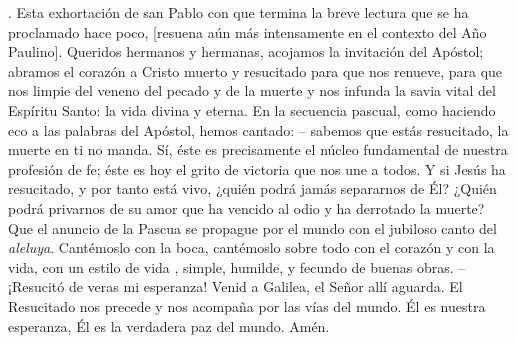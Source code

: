 \begin{body}
. Esta exhortación de san Pablo con que termina la breve lectura que se ha proclamado hace poco, [resuena aún más intensamente en el contexto del Año Paulino]. Queridos hermanos y hermanas, acojamos la invitación del Apóstol; abramos el corazón a Cristo muerto y resucitado para que nos renueve, para que nos limpie del veneno del pecado y de la muerte y nos infunda la savia vital del Espíritu Santo: la vida divina y eterna. En la secuencia pascual, como haciendo eco a las palabras del Apóstol, hemos cantado:  – sabemos que estás resucitado, la muerte en ti no manda. Sí, éste es precisamente el núcleo fundamental de nuestra profesión de fe; éste es hoy el grito de victoria que nos une a todos. Y si Jesús ha resucitado, y por tanto está vivo, ¿quién podrá jamás separarnos de Él? ¿Quién podrá privarnos de su amor que ha vencido al odio y ha derrotado la muerte? Que el anuncio de la Pascua se propague por el mundo con el jubiloso canto del \textit{aleluya}. Cantémoslo con la boca, cantémoslo sobre todo con el corazón y con la vida, con un estilo de vida , simple, humilde, y fecundo de buenas obras.  – ¡Resucitó de veras mi esperanza! Venid a Galilea, el Señor allí aguarda. El Resucitado nos precede y nos acompaña por las vías del mundo. Él es nuestra esperanza, Él es la verdadera paz del mundo. Amén.
\end{body}

